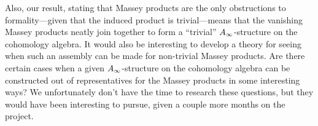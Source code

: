 Also, our result, stating that Massey products are the only obstructions to formality---given that the induced product is trivial---means that the vanishing Massey products neatly join together to form a ``trivial'' $A_{\infty}$-structure on the cohomology algebra. It would also be interesting to develop a theory for seeing when such an assembly can be made for non-trivial Massey products. Are there certain cases when a given $A_{\infty}$-structure on the cohomology algebra can be constructed out of representatives for the Massey products in some interesting ways? We unfortunately don't have the time to research these questions, but they would have been interesting to pursue, given a couple more months on the project. 
